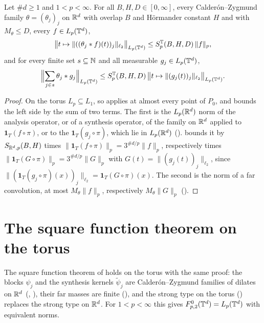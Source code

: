 \begin{theorem}
\label{thm:torus-vector-valued-strong-type}
\leanok
{}
Let $\#d \geq 1$ and $1 < p < \infty$. For all $B, H, D \in [0, \infty]$, every
Calder\'on--Zygmund family $\theta = (\theta_j)_j$ on $\mathbb{R}^d$ with overlap $B$ and H\"ormander
constant $H$ and with $M_\theta \leq D$, every $f \in L_p(\mathbb{T}^d)$,
\[
  \bigl\| t \mapsto \|((\theta_j * f)(t))_j\|_{\ell_2} \bigr\|_{L_p(\mathbb{T}^d)}
  \leq S^{\mathbb{T}}_{p}(B, H, D) \, \|f\|_p ,
\]
and for every finite set $s \subseteq \mathbb{N}$ and all measurable $g_j \in L_p(\mathbb{T}^d)$,
\[
  \Bigl\| \sum_{j \in s} \theta_j * g_j \Bigr\|_{L_p(\mathbb{T}^d)}
  \leq S^{\mathbb{T}}_{p}(B, H, D) \, \bigl\| t \mapsto \|(g_j(t))_j\|_{\ell_2} \bigr\|_{L_p(\mathbb{T}^d)} .
\]
\end{theorem}

\begin{proof}
\leanok
On the torus $L_p \subseteq L_1$, so  applies at almost every
point of $P_0$, and  bounds the left side by the sum of two
terms. The first is the $L_p(\mathbb{R}^d)$ norm of the analysis operator, or of a synthesis operator,
of the family on $\mathbb{R}^d$ applied to $\mathbf 1_T (f \circ \pi)$, or to the
$\mathbf 1_T (g_j \circ \pi)$, which lie in $L_p(\mathbb{R}^d)$ ().
 bounds it by $S_{\mathbb{R}^d,p}(B, H)$ times
$\|\mathbf 1_T (f \circ \pi)\|_p = 3^{\#d/p} \|f\|_p$, respectively times
$\|\mathbf 1_T (G \circ \pi)\|_p = 3^{\#d/p} \|G\|_p$ with $G(t) = \|(g_j(t))_j\|_{\ell_2}$, since
$\|(\mathbf 1_T (g_j \circ \pi)(x))_j\|_{\ell_2} = \mathbf 1_T (G \circ \pi)(x)$. The second is
the norm of a far convolution, at most $M_\theta \|f\|_p$, respectively $M_\theta \|G\|_p$
().
\end{proof}

\section{The square function theorem on the torus}
\label{sec:torus-square-function}

The square function theorem of  holds on the torus with the same
proof: the blocks $\psi_j$ and the synthesis kernels $\tilde\psi_j$ are Calder\'on--Zygmund
families of dilates on $\mathbb{R}^d$ (, ), their
far masses are finite (), and the strong type on the torus
() replaces the strong type on $\mathbb{R}^d$. For
$1 < p < \infty$ this gives $F^{0}_{p,2}(\mathbb{T}^d) = L_p(\mathbb{T}^d)$ with equivalent norms.

